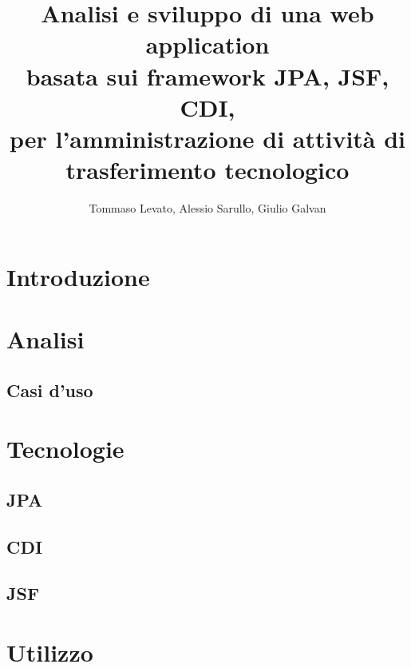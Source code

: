 \documentclass[a4paper,10pt]{report}
\title{Analisi e sviluppo di una web application \\
basata sui framework JPA, JSF, CDI, \\
per l'amministrazione di attività di trasferimento tecnologico}
\author{Tommaso Levato, Alessio Sarullo, Giulio Galvan}
\begin{document}
\maketitle


\begin{abstract}
\end{abstract}

\tableofcontents

\chapter{Introduzione}
\chapter{Analisi}
\section{Casi d'uso}

\chapter{Tecnologie}
\section{JPA}
\section{CDI}
\section{JSF}
\chapter{Utilizzo}
\end{document}
